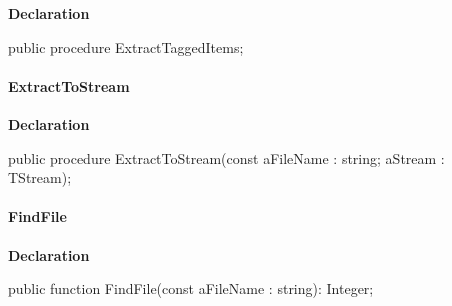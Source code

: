 \documentclass{report}
\newif\ifpdf
\begin{document}
\label{AbArcTyp.TAbArchive-ExtractTaggedItems}
\begin{list}{}{
\setlength{\itemindent}{0cm}
\setlength{\listparindent}{0cm}
\setlength{\leftmargin}{\evensidemargin}
\addtolength{\leftmargin}{\tmplength}
\settowidth{\labelsep}{X}
\addtolength{\leftmargin}{\labelsep}
\setlength{\labelwidth}{\tmplength}
}
\item[\textbf{Declaration}\hfill]
\ifpdf
\begin{flushleft}
\fi
\begin{ttfamily}
public procedure ExtractTaggedItems;\end{ttfamily}

\ifpdf
\end{flushleft}
\fi

\end{list}
\paragraph*{ExtractToStream}\hspace*{\fill}

\label{AbArcTyp.TAbArchive-ExtractToStream}
\begin{list}{}{
\setlength{\itemindent}{0cm}
\setlength{\listparindent}{0cm}
\setlength{\leftmargin}{\evensidemargin}
\addtolength{\leftmargin}{\tmplength}
\settowidth{\labelsep}{X}
\addtolength{\leftmargin}{\labelsep}
\setlength{\labelwidth}{\tmplength}
}
\item[\textbf{Declaration}\hfill]
\ifpdf
\begin{flushleft}
\fi
\begin{ttfamily}
public procedure ExtractToStream(const aFileName : string; aStream : TStream);\end{ttfamily}

\ifpdf
\end{flushleft}
\fi

\end{list}
\paragraph*{FindFile}\hspace*{\fill}

\label{AbArcTyp.TAbArchive-FindFile}
\begin{list}{}{
\setlength{\itemindent}{0cm}
\setlength{\listparindent}{0cm}
\setlength{\leftmargin}{\evensidemargin}
\addtolength{\leftmargin}{\tmplength}
\settowidth{\labelsep}{X}
\addtolength{\leftmargin}{\labelsep}
\setlength{\labelwidth}{\tmplength}
}
\item[\textbf{Declaration}\hfill]
\ifpdf
\begin{flushleft}
\fi
\begin{ttfamily}
public function FindFile(const aFileName : string): Integer;\end{ttfamily}

\ifpdf
\end{flushleft}
\fi

\end{list}
\end{document}
